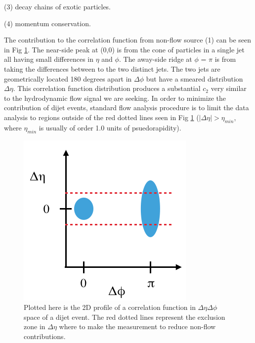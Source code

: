 (3) decay chains of exotic particles.

(4) momentum conservation.

The contribution to the correlation function from non-flow source (1) can be seen in Fig \ref{fig:jet_corr_example}. The near-side peak at (0,0) is from the cone of particles in a single jet all having small differences in $\eta$ and $\phi$. The away-side ridge at $\phi$ = $\pi$ is from taking the differences between to the two distinct jets. The two jets are geometrically located 180 degrees apart in $\Delta\phi$ but have a smeared distribution $\Delta\eta$. This correlation function distribution produces a substantial $c_2$ very similar to the hydrodynamic flow signal we are seeking. In order to minimize the contribution of dijet events, standard flow analysis procedure is to limit the data analysis to regions outside of the red dotted lines seen in Fig \ref{fig:jet_corr_example} ($|\Delta\eta| > \eta_{min}$, where $\eta_{min}$ is usually of order 1.0 units of psuedorapidity).

\begin{figure}
\begin{center}
\includegraphics[width=0.5\linewidth]{figs/jet_corr_example.png}
\caption{Plotted here is the 2D profile of a correlation function in $\Delta\eta \Delta\phi$ space of a dijet event. The red dotted lines represent the exclusion zone in $\Delta\eta$ where to  make the measurement to reduce non-flow contributions.}
\label{fig:jet_corr_example}
\end{center}
\end{figure}

